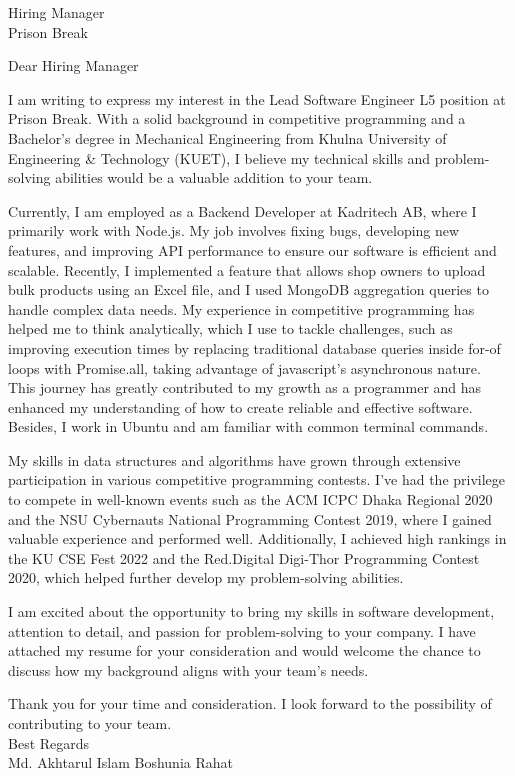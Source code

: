 \documentclass[a4paper,11pt]{letter}
\date{November 11, 2024} %
\begin{document}
\begin{letter}{Hiring Manager \\ Prison Break}

\opening
{Dear Hiring Manager}

I am writing to express my interest in the Lead Software Engineer L5 position at Prison Break. With a solid background in competitive programming and a Bachelor’s degree in Mechanical Engineering from Khulna University of Engineering \& Technology (KUET), I believe my technical skills and problem-solving abilities would be a valuable addition to your team.

Currently, I am employed as a Backend Developer at Kadritech AB, where I primarily work with Node.js. My job involves fixing bugs, developing new features, and improving API performance to ensure our software is efficient and scalable. Recently, I implemented a feature that allows shop owners to upload bulk products using an Excel file, and I used MongoDB aggregation queries to handle complex data needs. My experience in competitive programming has helped me to think analytically, which I use to tackle challenges, such as improving execution times by replacing traditional database queries inside for-of loops with Promise.all, taking advantage of javascript's asynchronous nature. This journey has greatly contributed to my growth as a programmer and has enhanced my understanding of how to create reliable and effective software. Besides, I work in Ubuntu and am familiar with common terminal commands.

My skills in data structures and algorithms have grown through extensive participation in various competitive programming contests. I’ve had the privilege to compete in well-known events such as the ACM ICPC Dhaka Regional 2020 and the NSU Cybernauts National Programming Contest 2019, where I gained valuable experience and performed well. Additionally, I achieved high rankings in the KU CSE Fest 2022 and the Red.Digital Digi-Thor Programming Contest 2020, which helped further develop my problem-solving abilities.


I am excited about the opportunity to bring my skills in software development, attention to detail, and passion for problem-solving to your company. I have attached my resume for your consideration and would welcome the chance to discuss how my background aligns with your team’s needs.

Thank you for your time and consideration. I look forward to the possibility of contributing to your team.\\

Best Regards\\
Md. Akhtarul Islam Boshunia Rahat

\end{letter}
\end{document}
